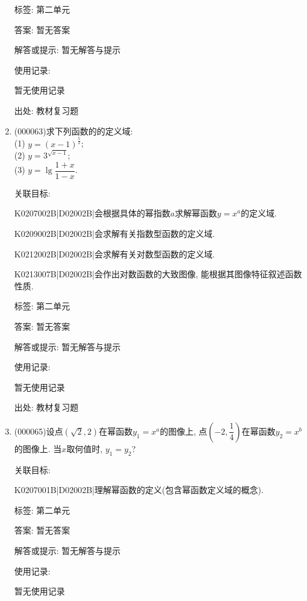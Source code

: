 \documentclass[10pt,a4paper]{article}
\begin{document}
\begin{enumerate}[1.]
标签: 第二单元

答案: 暂无答案

解答或提示: 暂无解答与提示

使用记录:

暂无使用记录


出处: 教材复习题
\item { (000063)}求下列函数的的定义域:\\
(1) $y=(x-1)^{\frac 52}$;\\
(2) $y=3^{\sqrt{x-1}}$;\\
(3) $y=\lg \dfrac{1+x}{1-x}$.


关联目标:

K0207002B|D02002B|会根据具体的幂指数$a$求解幂函数$y=x^{a}$的定义域.

K0209002B|D02002B|会求解有关指数型函数的定义域.

K0212002B|D02002B|会求解有关对数型函数的定义域.

K0213007B|D02002B|会作出对数函数的大致图像, 能根据其图像特征叙述函数性质.



标签: 第二单元

答案: 暂无答案

解答或提示: 暂无解答与提示

使用记录:

暂无使用记录


出处: 教材复习题
\item { (000065)}设点$(\sqrt 2, 2)$在幂函数$y_1=x^a$的图像上, 点$(-2,\dfrac 14)$在幂函数$y_2=x^b$的图像上. 当$x$取何值时, $y_1=y_2$?


关联目标:

K0207001B|D02002B|理解幂函数的定义(包含幂函数定义域的概念).



标签: 第二单元

答案: 暂无答案

解答或提示: 暂无解答与提示

使用记录:

暂无使用记录



\end{enumerate}
\end{document}
